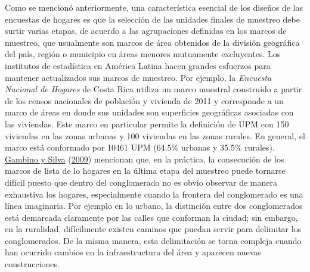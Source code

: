 \documentclass[
  12pt,
  spanish,
]{book}
\begin{document}
Como se mencionó anteriormente, una característica esencial de los diseños de las encuestas de hogares es que la selección de las unidades finales de muestreo debe surtir varias etapas, de acuerdo a las agrupaciones definidas en los marcos de muestreo, que usualmente son marcos de área obtenidos de la división geográfica del país, región o municipio en áreas menores mutuamente excluyentes. Los institutos de estadística en América Latina hacen grandes esfuerzos para mantener actualizados sus marcos de muestreo. Por ejemplo, la \emph{Encuesta Nacional de Hogares} de Costa Rica utiliza un marco muestral construido a partir de los censos nacionales de población y vivienda de 2011 y corresponde a un marco de áreas en donde sus unidades son superficies geográficas asociadas con las viviendas. Este marco en particular permite la definición de UPM con 150 viviendas en las zonas urbanas y 100 viviendas en las zonas rurales. En general, el marco está conformado por 10461 UPM (64.5\% urbanas y 35.5\% rurales). \protect\hyperlink{ref-Gambino_Silva_2009}{Gambino y Silva} (\protect\hyperlink{ref-Gambino_Silva_2009}{2009}) mencionan que, en la práctica, la consecución de los marcos de lista de lo hogares en la última etapa del muestreo puede tornarse difícil puesto que dentro del conglomerado no es obvio observar de manera exhaustiva los hogares, especialmente cuando la frontera del conglomerado es una línea imaginaria. Por ejemplo en lo urbano, la distinción entre dos conglomerados está demarcada claramente por las calles que conforman la ciudad; sin embargo, en la ruralidad, difícilmente existen caminos que puedan servir para delimitar los conglomerados. De la misma manera, esta delimitación se torna compleja cuando han ocurrido cambios en la infraestructura del área y aparecen nuevas construcciones.
\end{document}
